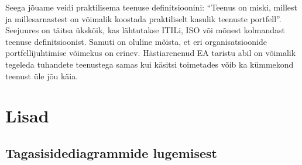 \documentclass{tufte-book}
\begin{document}
Seega jõuame veidi praktilisema teenuse definitsioonini: \enquote{Teenus on miski, millest ja millesarnastest on võimalik koostada praktiliselt kasulik teenuste portfell}. Seejuures on täitsa ükskõik, kas lähtutakse ITILi, ISO või mõnest kolmandast teenuse definitsioonist. Samuti on oluline mõista, et eri organisatsioonide portfellijuhtimise võimekus on erinev. Hästiarenenud EA taristu abil on võimalik tegeleda tuhandete teenustega samas kui käsitsi toimetades võib ka kümmekond teenust üle jõu käia. 

\chapter{Lisad}
\section{Tagasisidediagrammide lugemisest}




\backmatter
\nocite{*}

 

\printindex
\end{document}

